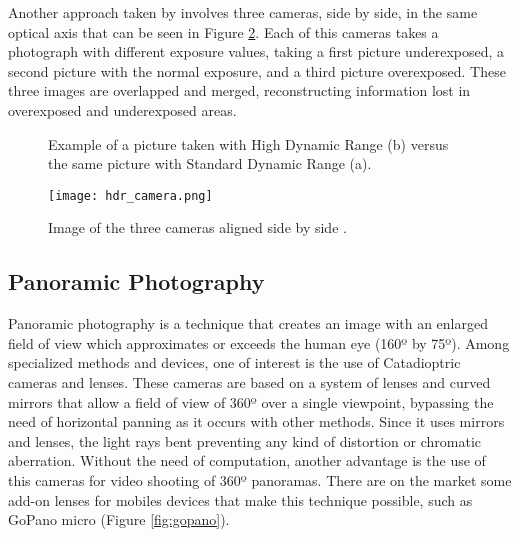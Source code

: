 Another approach taken by \cite{Vavilin2011} involves three cameras, side by side, in the same optical axis that can be seen in Figure \ref{fig:hdr_camera}. Each of this cameras takes a photograph with different exposure values, taking a first picture underexposed, a second picture with the normal exposure, and a third picture overexposed. These three images are overlapped and merged, reconstructing information lost in overexposed and underexposed areas.

\begin{figure}[htbp]
        \centering
  \caption{Example of a picture taken with High Dynamic Range (b) versus the same picture with Standard Dynamic Range (a).}
  \label{fig:hdr_example}
\end{figure}

\begin{figure}[htbp]
	\centering
	\texttt{[image: hdr\_camera.png]}
	\caption{Image of the three cameras aligned side by side \cite{Vavilin2011}.}
	\label{fig:hdr_camera}
\end{figure}

\subsection{Panoramic Photography}

Panoramic photography is a technique that creates an image with an enlarged field of view which approximates or exceeds the human eye (160º by 75º). Among specialized methods and devices, one of interest is the use of Catadioptric cameras and lenses. These cameras are based on a system of lenses and curved mirrors that allow a field of view of 360º over a single viewpoint, bypassing the need of horizontal panning as it occurs with other methods. Since it uses mirrors and lenses, the light rays bent preventing any kind of distortion or chromatic aberration. Without the need of computation, another advantage is the use of this cameras for video shooting of 360º panoramas. 
There are on the market some add-on lenses for mobiles devices that make this technique possible, such as GoPano micro (Figure \ref{fig:gopano}).

